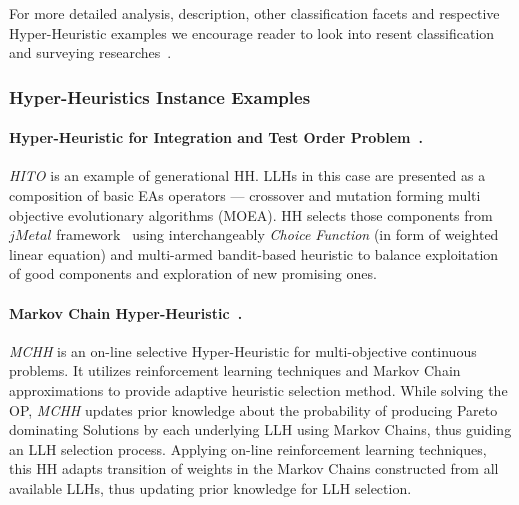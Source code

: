 
	


For more detailed analysis, description, other classification facets and respective Hyper-Heuristic examples we encourage reader to look into resent classification and surveying researches~\cite{burke2003hyper,ryser2014review,drake2019recent,burke2019classification}.

\subsubsection{Hyper-Heuristics Instance Examples}\label{bg: hh examples}
\paragraph{Hyper-Heuristic for Integration and Test Order Problem~\cite{guizzo2015hyper}.} \textit{HITO} is an example of generational HH. LLHs in this case are presented as a composition of basic EAs operators — crossover and mutation forming multi objective evolutionary algorithms (MOEA). HH selects those components from $jMetal$ framework~\cite{durillo2011jmetal} using interchangeably \emph{Choice Function} (in form of weighted linear equation) and multi-armed bandit-based heuristic to balance exploitation of good components and exploration of new promising ones.


\paragraph{Markov Chain Hyper-Heuristic~\cite{mcclymont2011markov}.} \textit{MCHH} is an on-line selective Hyper-Heuristic for multi-objective continuous problems. It utilizes reinforcement learning techniques and Markov Chain approximations to provide adaptive heuristic selection method. While solving the OP, \textit{MCHH} updates prior knowledge about the probability of producing Pareto dominating Solutions by each underlying LLH using Markov Chains, thus guiding an LLH selection process. Applying on-line reinforcement learning techniques, this HH adapts transition of weights in the Markov Chains constructed from all available LLHs, thus updating prior knowledge for LLH selection.


